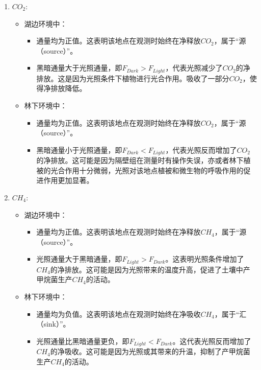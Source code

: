 \documentclass[10.5pt]{config}
\begin{document}
\begin{enumerate}
    \item $CO_2$:
    \begin{itemize}
        \item 湖边环境中：
        \begin{itemize}
            \item 通量均为正值。这表明该地点在观测时始终在净释放$CO_2$，属于“源（source）”。
            \item 黑暗通量大于光照通量，即$F_{Dark}>F_{Light}$，代表光照减少了$CO_2$的净排放。这是因为光照条件下植物进行光合作用。吸收了一部分$CO_2$，使得净排放降低。
        \end{itemize}
        \item 林下环境中：
        \begin{itemize}
            \item 通量均为正值。这表明该地点在观测时始终在净释放$CO_2$，属于“源（source）”。
            \item 黑暗通量小于光照通量，即$F_{Dark}<F_{Light}$，代表光照反而增加了$CO_2$的净排放。这可能是因为隔壁组在测量时有操作失误，亦或者林下植被的光合作用十分微弱，光照对该地点植被和微生物的呼吸作用的促进作用更加显著。
        \end{itemize}
    \end{itemize}
\item $CH_4$:
    \begin{itemize}
        \item 湖边环境中：
        \begin{itemize}
            \item 通量均为正值。这表明该地点在观测时始终在净释放$CH_4$，属于“源（source）”。
            \item 光照通量大于黑暗通量，即$F_{Light}>F_{Dark}$。这表明光照条件增加了$CH_4$的净排放。这可能是因为光照带来的温度升高，促进了土壤中产甲烷菌生产$CH_4$的活动。
        \end{itemize}
        \item 林下环境中：
        \begin{itemize}
            \item 通量均为负值。这表明该地点在观测时始终在净吸收$CH_4$，属于“汇（sink）”。
            \item 光照通量比黑暗通量更负，即$F_{Light}<F_{Dark}$。这代表光照反而增加了$CH_4$的净吸收。这可能是因为光照或其带来的升温，抑制了产甲烷菌生产$CH_4$的活动。
        \end{itemize}
    \end{itemize}
    

\end{enumerate}
\end{document}
